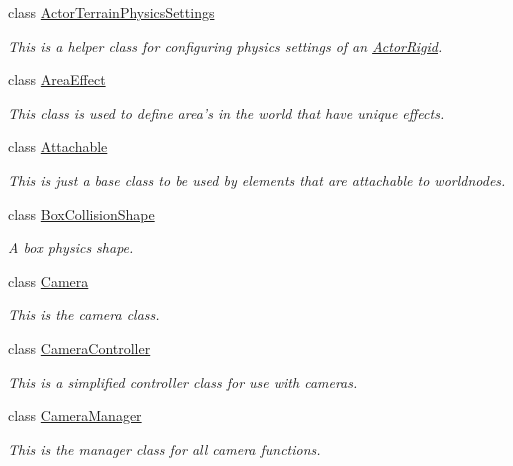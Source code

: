 \begin{DoxyCompactItemize}
class \hyperlink{classphys_1_1ActorTerrainPhysicsSettings}{ActorTerrainPhysicsSettings}
\begin{DoxyCompactList}\small\item\em This is a helper class for configuring physics settings of an \hyperlink{classphys_1_1ActorRigid}{ActorRigid}. \item\end{DoxyCompactList}\item 
class \hyperlink{classphys_1_1AreaEffect}{AreaEffect}
\begin{DoxyCompactList}\small\item\em This class is used to define area's in the world that have unique effects. \item\end{DoxyCompactList}\item 
class \hyperlink{classphys_1_1Attachable}{Attachable}
\begin{DoxyCompactList}\small\item\em This is just a base class to be used by elements that are attachable to worldnodes. \item\end{DoxyCompactList}\item 
class \hyperlink{classphys_1_1BoxCollisionShape}{BoxCollisionShape}
\begin{DoxyCompactList}\small\item\em A box physics shape. \item\end{DoxyCompactList}\item 
class \hyperlink{classphys_1_1Camera}{Camera}
\begin{DoxyCompactList}\small\item\em This is the camera class. \item\end{DoxyCompactList}\item 
class \hyperlink{classphys_1_1CameraController}{CameraController}
\begin{DoxyCompactList}\small\item\em This is a simplified controller class for use with cameras. \item\end{DoxyCompactList}\item 
class \hyperlink{classphys_1_1CameraManager}{CameraManager}
\begin{DoxyCompactList}\small\item\em This is the manager class for all camera functions. \item\end{DoxyCompactList}\item 

\end{DoxyCompactItemize}
